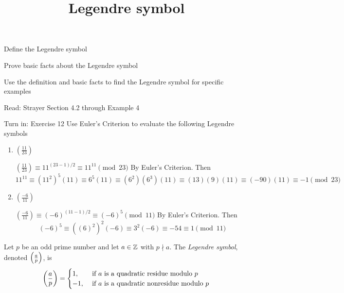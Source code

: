\documentclass{ximera}
\title{Legendre symbol}
\begin{document}
\begin{abstract}
\end{abstract}
\maketitle


\begin{obj}
    \item Define the Legendre symbol
    \item Prove basic facts about the Legendre symbol
    \item Use the definition and basic facts to find the Legendre symbol for specific examples
\end{obj}


\begin{pre}
    \item[Read:] Strayer Section 4.2 through Example 4
    \item[Turn in:] Exercise 12
     Use Euler's Criterion to evaluate the following Legendre symbols 
	\begin{enumerate}
 		\item $\left(\frac{11}{23}\right)$
		
		\begin{solution}
 			$\left(\frac{11}{23}\right)\equiv 11^{(23-1)/2}\equiv 11^{11}\pmod{23}$ By Euler's Criterion. Then
			\[11^{11}\equiv (11^{2})^{5}(11)\equiv 6^5(11)\equiv (6^2)(6^3)(11)\equiv (13)(9)(11)\equiv(-90)(11)\equiv -1\pmod{23}\]
		\end{solution}
		
		\item $\left(\frac{-6}{11}\right)$
		
		\begin{solution}
 			$\left(\frac{-6}{11}\right)\equiv (-6)^{(11-1)/2}\equiv (-6)^{5}\pmod{11}$ By Euler's Criterion. Then
			\[(-6)^{5}\equiv ((6)^{2})^{2}(-6)\equiv 3^2(-6)\equiv -54 \equiv 1\pmod{11}\]
		\end{solution}
	\end{enumerate}
 

\end{pre}



\begin{definition}\label{defn:legendre}
    Let $p$ be an odd prime number and let $a\in\mathbb Z$ with $p\nmid a$. The \emph{Legendre symbol}, denoted $\left(\frac{a}{p}\right)$, is
        \[
            \left(\frac{a}{p}\right)=
            \begin{cases}
                1, & \text{ if $a$ is a quadratic residue modulo $p$} \\
                -1, & \text{ if $a$ is a quadratic nonresidue modulo $p$} 
            \end{cases}
        \]
\end{definition}
\end{document}
